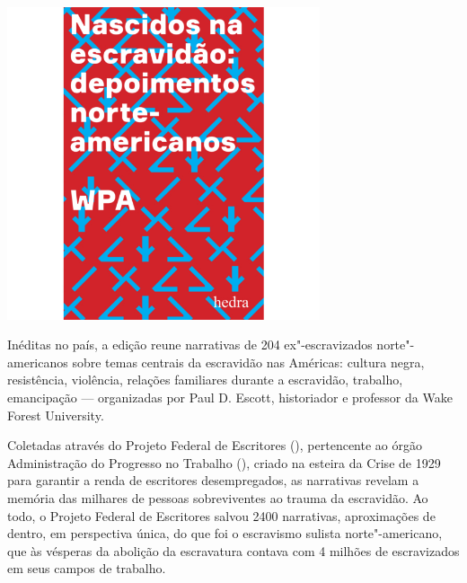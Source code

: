 \pagebreak

\begin{center}
\hspace*{-2.5cm}
\hspace*{2.5cm}\includegraphics[width=92mm]{./grid/wpa.jpg}
\end{center}

\hspace*{-7cm}\hrulefill\hspace*{-7cm}

\medskip

\noindent{}Inéditas no país, a edição reune narrativas de 204 ex"-escravizados norte"-americanos sobre temas centrais da escravidão nas Américas: cultura negra, resistência, violência, relações familiares durante a escravidão, trabalho, emancipação --- organizadas por Paul D. Escott, historiador e professor da Wake Forest University.

Coletadas através do Projeto Federal de Escritores (), pertencente ao órgão Administração do Progresso no Trabalho (), criado na esteira da Crise de 1929 para garantir a renda de escritores desempregados, as narrativas revelam a memória das milhares de pessoas sobreviventes ao trauma da escravidão. Ao todo, o Projeto Federal de Escritores salvou 2400 narrativas, aproximações de dentro, em perspectiva única, do que foi o escravismo sulista norte"-americano, que às vésperas da abolição da escravatura contava com 4 milhões de escravizados em seus campos de trabalho.

\vfill

